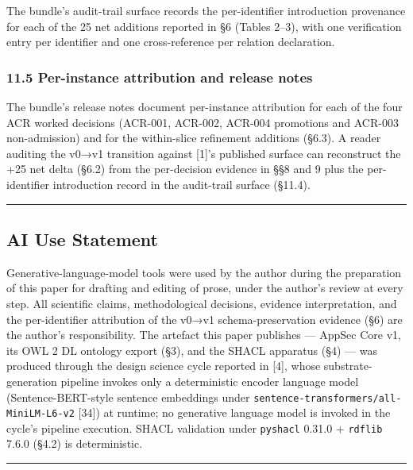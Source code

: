 \documentclass[
]{article}
\begin{document}
The bundle's audit-trail surface records the per-identifier introduction
provenance for each of the 25 net additions reported in §6 (Tables
2--3), with one verification entry per identifier and one
cross-reference per relation declaration.

\subsubsection{11.5 Per-instance attribution and release
notes}\label{per-instance-attribution-and-release-notes}

The bundle's release notes document per-instance attribution for each of
the four ACR worked decisions (ACR-001, ACR-002, ACR-004 promotions and
ACR-003 non-admission) and for the within-slice refinement additions
(§6.3). A reader auditing the v0→v1 transition against {[}1{]}'s
published surface can reconstruct the +25 net delta (§6.2) from the
per-decision evidence in §§8 and 9 plus the per-identifier introduction
record in the audit-trail surface (§11.4).

\begin{center}\rule{0.5\linewidth}{0.5pt}\end{center}

\subsection{AI Use Statement}\label{ai-use-statement}

Generative-language-model tools were used by the author during the
preparation of this paper for drafting and editing of prose, under the
author's review at every step. All scientific claims, methodological
decisions, evidence interpretation, and the per-identifier attribution
of the v0→v1 schema-preservation evidence (§6) are the author's
responsibility. The artefact this paper publishes --- AppSec Core v1,
its OWL 2 DL ontology export (§3), and the SHACL apparatus (§4) --- was
produced through the design science cycle reported in {[}4{]}, whose
substrate-generation pipeline invokes only a deterministic encoder
language model (Sentence-BERT-style sentence embeddings under
\texttt{sentence-transformers/all-MiniLM-L6-v2} {[}34{]}) at runtime; no
generative language model is invoked in the cycle's pipeline execution.
SHACL validation under \texttt{pyshacl} 0.31.0 + \texttt{rdflib} 7.6.0
(§4.2) is deterministic.

\begin{center}\rule{0.5\linewidth}{0.5pt}\end{center}
\end{document}
